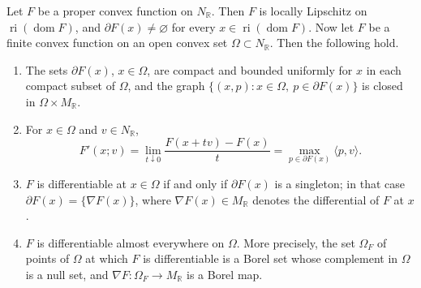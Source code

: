 \begin{proposition}\label{prop:convex-local-regularity-and-subgradients}
Let $F$ be a proper convex function on $N_{\mathbb R}$. Then $F$ is locally Lipschitz on $\operatorname{ri}(\operatorname{dom}F)$, and $\partial F(x)\neq\varnothing$ for every $x\in\operatorname{ri}(\operatorname{dom}F)$. Now let $F$ be a finite convex function on an open convex set $\Omega\subset N_{\mathbb R}$. Then the following hold.
\begin{enumerate}
\item The sets $\partial F(x)$, $x\in\Omega$, are compact and bounded uniformly for $x$ in each compact subset of $\Omega$, and the graph $\{(x,p):x\in\Omega,\ p\in\partial F(x)\}$ is closed in $\Omega\times M_{\mathbb R}$.
\item For $x\in\Omega$ and $v\in N_{\mathbb R}$,
\[
 F'(x;v)=\lim_{t\downarrow0}\frac{F(x+tv)-F(x)}t
                 =\max_{p\in\partial F(x)}\langle p,v\rangle.
\]
\item $F$ is differentiable at $x\in\Omega$ if and only if $\partial F(x)$ is a singleton; in that case $\partial F(x)=\{\nabla F(x)\}$, where $\nabla F(x)\in M_{\mathbb R}$ denotes the differential of $F$ at $x$.
\item $F$ is differentiable almost everywhere on $\Omega$. More precisely, the set $\Omega_F$ of points of $\Omega$ at which $F$ is differentiable is a Borel set whose complement in $\Omega$ is a null set, and $\nabla F\colon\Omega_F\to M_{\mathbb R}$ is a Borel map.
\end{enumerate}
\end{proposition}

